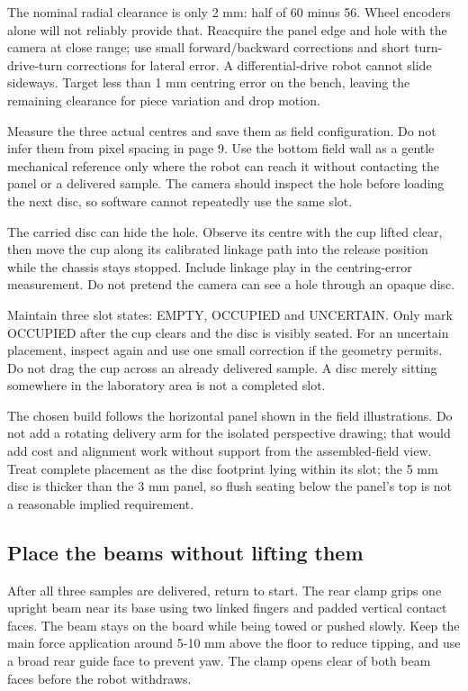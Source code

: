 \documentclass[10pt,a4paper]{article}
\begin{document}
The nominal radial clearance is only 2 mm: half of 60 minus 56. Wheel encoders alone will not reliably provide that. Reacquire the panel edge and hole with the camera at close range; use small forward/backward corrections and short turn-drive-turn corrections for lateral error. A differential-drive robot cannot slide sideways. Target less than 1 mm centring error on the bench, leaving the remaining clearance for piece variation and drop motion.

Measure the three actual centres and save them as field configuration. Do not infer them from pixel spacing in page 9. Use the bottom field wall as a gentle mechanical reference only where the robot can reach it without contacting the panel or a delivered sample. The camera should inspect the hole before loading the next disc, so software cannot repeatedly use the same slot.

The carried disc can hide the hole. Observe its centre with the cup lifted clear, then move the cup along its calibrated linkage path into the release position while the chassis stays stopped. Include linkage play in the centring-error measurement. Do not pretend the camera can see a hole through an opaque disc.

Maintain three slot states: EMPTY, OCCUPIED and UNCERTAIN. Only mark OCCUPIED after the cup clears and the disc is visibly seated. For an uncertain placement, inspect again and use one small correction if the geometry permits. Do not drag the cup across an already delivered sample. A disc merely sitting somewhere in the laboratory area is not a completed slot.

The chosen build follows the horizontal panel shown in the field illustrations. Do not add a rotating delivery arm for the isolated perspective drawing; that would add cost and alignment work without support from the assembled-field view. Treat complete placement as the disc footprint lying within its slot; the 5 mm disc is thicker than the 3 mm panel, so flush seating below the panel's top is not a reasonable implied requirement.

\subsection{Place the beams without lifting them}
After all three samples are delivered, return to start. The rear clamp grips one upright beam near its base using two linked fingers and padded vertical contact faces. The beam stays on the board while being towed or pushed slowly. Keep the main force application around 5-10 mm above the floor to reduce tipping, and use a broad rear guide face to prevent yaw. The clamp opens clear of both beam faces before the robot withdraws.
\end{document}

